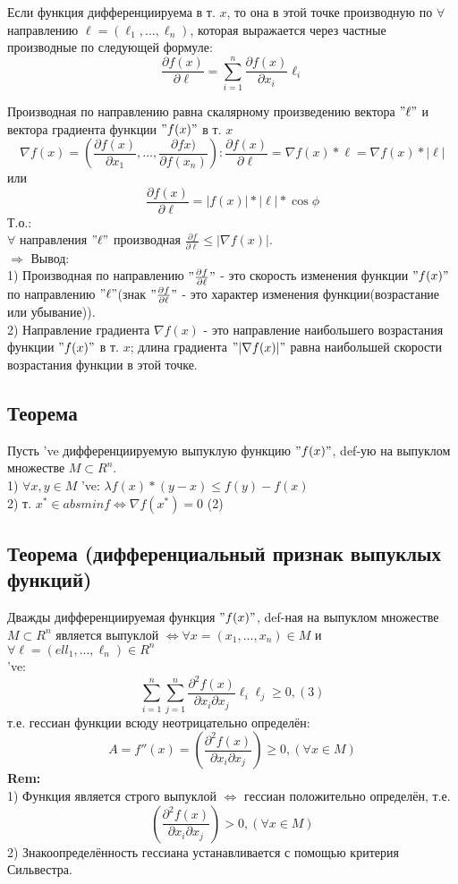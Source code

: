 Если функция дифференциируема в т. $x$, то она в этой точке производную по $\forall$ направлению $\ell = (\ell_1, ... , \ell_n)$, которая выражается через частные производные по следующей формуле: 
$$
\frac{\partial f(x)}{\partial \ell} = \sum_{i = 1}^{n} \frac{\partial f(x)}{\partial x_i} \ell_i
$$



Производная по направлению равна скалярному произведению вектора $"\ell"$ и вектора градиента функции $"f(x)"$ в т. $x$ \\
$$\nabla f(x) = \left(\frac{\partial f(x)}{\partial x_1} , ... , \frac{\partial fx)}{\partial f(x_n)}\right): \frac{\partial f(x)}{\partial \ell} = \nabla f(x) * \ell = \nabla f(x) * |\ell|$$
или \\
$$\frac{\partial f(x)}{\partial \ell} = |f(x)| * |\ell| * \cos{\phi}$$
Т.о.: \\
$\forall$ направления $"\ell"$ производная $\frac{\partial f}{\partial \ell} \leqslant |\nabla f(x)|$. \\
$\Rightarrow$ Вывод: \\
1) Производная по направлению $"\frac{\partial f}{\partial \ell}"$ - это скорость изменения функции $"f(x)"$ по направлению $"\ell"$(знак $"\frac{\partial f}{\partial \ell}"$ - это характер изменения функции(возрастание или убывание)). \\
2) Направление градиента $\nabla f(x)$ - это направление наибольшего возрастания функции $"f(x)"$ в т. $x$; длина градиента $"|\nabla f(x)|"$ равна наибольшей скорости возрастания функции в этой точке. \\
\subsection{Теорема} 
Пусть 've дифференциируемую выпуклую функцию $"f(x)"$, def-ую на выпуклом множестве $M \subset R^n$. \\
1) $\forall x, y \in M$ 've: $\lambda f(x) * (y-x) \leqslant f(y) - f(x)$ \\
2) т. $x^* \in absminf \Leftrightarrow \nabla f(x^*) = 0$ (2) \\
\subsection{Теорема (дифференциальный признак выпуклых функций)}
Дважды дифференциируемая функция $"f(x)"$, def-ная на выпуклом множестве $M \subset R^n$ является выпуклой $\Leftrightarrow \forall x = (x_1, ... , x_n) \in M$ и $\forall \ell = (ell_1, ... , \ell_n) \in R^n$ \\
've: 
$$ \sum_{i = 1}^n \sum_{j=1}^n \frac{\partial^2 f(x)}{\partial x_i \partial x_j} \ell_i \ell_j \geqslant 0, (3) $$
т.е. гессиан функции всюду неотрицательно определён: \\
$$ A = f''(x) = \left(\frac{\partial^2 f(x)}{\partial x_i \partial x_j} \right) \geqslant 0, (\forall x \in M)$$
\textbf{Rem:} \\
1) Функция является строго выпуклой $\Leftrightarrow$ гессиан положительно определён, т.е. 
$$ \left(\frac{\partial^2 f(x)}{\partial x_i \partial x_j}\right) > 0, (\forall x \in M)$$
2) Знакоопределённость гессиана устанавливается с помощью критерия Сильвестра.


